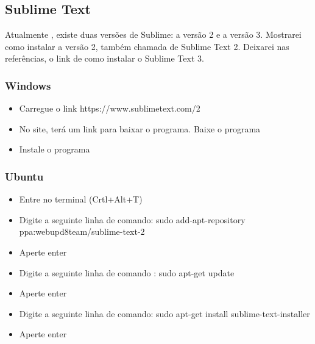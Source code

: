 \subsection{Sublime Text}

Atualmente , existe duas versões de Sublime: a versão 2 e a versão 3. Mostrarei como instalar a versão 2, também chamada de Sublime Text 2. Deixarei nas referências, o link de como instalar o Sublime Text 3.

\subsubsection{Windows}

\begin{itemize}
    \item Carregue o link https://www.sublimetext.com/2 
    \item No site, terá um link para baixar o programa. Baixe o programa
    \item Instale o programa
\end{itemize}

\subsubsection{Ubuntu}
\begin{itemize}
    \item Entre no terminal (Crtl+Alt+T)
    \item Digite a seguinte linha de comando: sudo add-apt-repository ppa:webupd8team/sublime-text-2
    \item Aperte enter
    \item Digite a seguinte linha de comando : sudo apt-get update
    \item Aperte enter
    \item Digite a seguinte linha de comando: sudo apt-get install sublime-text-installer
    \item Aperte enter
\end{itemize}
    

